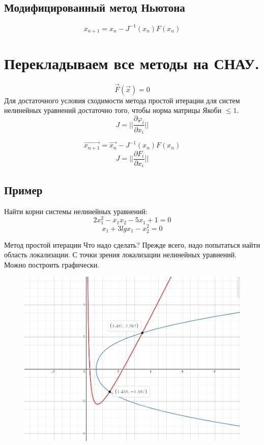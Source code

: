 \documentclass[a4paper,12pt]{article}
\newcommand\attention[1]{\colorbox{cyan!30}{#1}}
\begin{document}
\subsection{Модифицированный метод Ньютона}
    \[x_{n+1} = x_n - J^{-1}(x_n) F(x_n)\]


\section{Перекладываем все методы на СНАУ.}
    $$\overrightarrow{F}(\overrightarrow{x}) = 0$$
    Для достаточного условия сходимости метода простой итерации для систем нелинейных уравнений достаточно того, чтобы норма матрицы Якоби $\leq 1$. 
    $$J = ||\frac{\partial \varphi _i}{\partial x_i}||$$

    \[\overrightarrow{x_{n+1}} = \overrightarrow{x_n} - J ^ {-1} (x_n) F(x_n)\]
    \[J = ||\frac{\partial F_i}{\partial x_i}||\]

\subsection{Пример}
    Найти корни системы нелинейных уравнений:
    \[2x_1^2 - x_1 x_2 - 5x_1 + 1 = 0\]
    \[x_1 + 3lgx_1 - x_2^2 = 0\]
    
    \attention{Метод простой итерации}
    Что надо сделать? Прежде всего, надо попытаться найти область локализации. С точки зрения локализации нелинейных уравнений. Можно построить графически. \newpage
    
    \begin{figure}[h!]
        \centering
        \includegraphics[width=12cm]{6SemPic1.png}
        \label{fig:vac}
    \end{figure}
\end{document}
